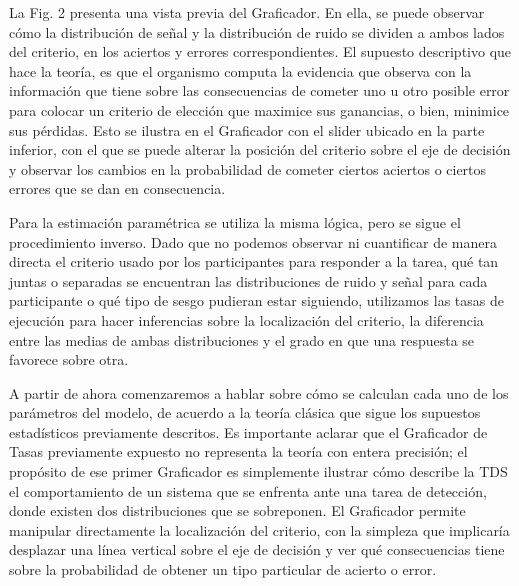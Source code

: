 La Fig. 2 presenta una vista previa del Graficador. En ella, se puede observar cómo la distribución de señal y la distribución de ruido se dividen a ambos lados del criterio, en los aciertos y errores correspondientes. El supuesto descriptivo que hace la teoría, es que el organismo computa la evidencia que observa con la información que tiene sobre las consecuencias de cometer uno u otro posible error para colocar un criterio de elección que maximice sus ganancias, o bien, minimice sus pérdidas.  Esto se ilustra en el Graficador con el slider ubicado en la parte inferior, con el que se puede alterar la posición del criterio sobre el eje de decisión y observar los cambios en la probabilidad de cometer ciertos aciertos o ciertos errores que se dan en consecuencia.

Para la estimación paramétrica se utiliza la misma lógica, pero se sigue el procedimiento inverso. Dado que no podemos observar ni cuantificar de manera directa el criterio usado por los participantes para responder a la tarea, qué tan juntas o separadas se encuentran las distribuciones de ruido y señal para cada participante o qué tipo de sesgo pudieran estar siguiendo, utilizamos las tasas de ejecución para hacer inferencias sobre la localización del criterio, la diferencia entre las medias de ambas distribuciones y el grado en que una respuesta se favorece sobre otra. 

A partir de ahora comenzaremos a hablar sobre cómo se calculan cada uno de los parámetros del modelo, de acuerdo a la teoría clásica que sigue los supuestos estadísticos previamente descritos.  Es importante aclarar que el Graficador de Tasas previamente expuesto no representa la teoría con entera precisión; el propósito de ese primer Graficador es simplemente ilustrar cómo describe la TDS el comportamiento de un sistema que se enfrenta ante una tarea de detección, donde existen dos distribuciones que se sobreponen. El Graficador permite manipular directamente la localización del criterio, con la simpleza que implicaría desplazar una línea vertical sobre el eje de decisión y ver qué consecuencias tiene sobre la probabilidad de obtener un tipo particular de acierto o error.



